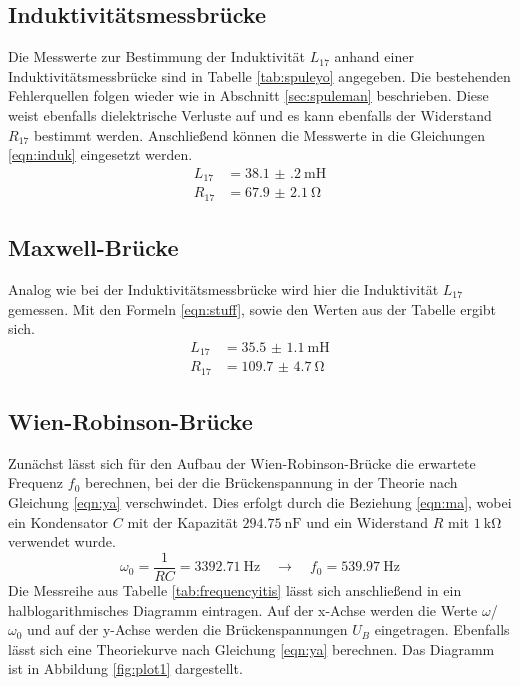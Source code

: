 \subsection{Induktivitätsmessbrücke}
Die Messwerte zur Bestimmung der Induktivität $L_{17}$ anhand einer Induktivitätsmessbrücke sind in Tabelle \ref{tab:spuleyo} angegeben. Die bestehenden Fehlerquellen
folgen wieder wie in Abschnitt \ref{sec:spuleman} beschrieben. Diese weist ebenfalls dielektrische Verluste 
auf und es kann ebenfalls der Widerstand $R_{17}$ bestimmt werden. Anschließend können die Messwerte in die Gleichungen \eqref{eqn:induk} eingesetzt werden.
\begin{align*}
L_{17} &= \SI{38.1(2)}{\milli\henry} \\
R_{17} &= \SI{67.9(21)}{\ohm} 
\end{align*}

\subsection{Maxwell-Brücke}
Analog wie bei der Induktivitätsmessbrücke wird hier die Induktivität $L_{17}$ gemessen. Mit den Formeln \eqref{eqn:stuff}, sowie den Werten aus der Tabelle ergibt sich.
\begin{align*}
    L_{17} &= \SI{35.5(11)}{\milli\henry} \\
    R_{17} &= \SI{109.7(47)}{\ohm} 
\end{align*}

\subsection{Wien-Robinson-Brücke}
Zunächst lässt sich für den Aufbau der Wien-Robinson-Brücke die erwartete Frequenz $f_{0}$ berechnen, bei der die Brückenspannung in der Theorie nach Gleichung \eqref{eqn:ya}
verschwindet. Dies erfolgt durch die Beziehung \eqref{eqn:ma}, wobei ein Kondensator $C$ mit der Kapazität $\SI{294.75}{\nano\farad}$ und ein Widerstand $R$ mit $\SI{1}{\kilo\ohm}$ verwendet wurde.
\begin{equation*}
\omega_{0} = \frac{1}{RC} = \SI{3392.71}{\hertz}  \quad \to \quad f_{0} = \SI{539.97}{\hertz}
\end{equation*}
Die Messreihe aus Tabelle \ref{tab:frequencyitis} lässt sich anschließend in ein halblogarithmisches Diagramm eintragen. Auf der x-Achse werden die Werte $\omega$/$\omega_{0}$ und auf der y-Achse werden die Brückenspannungen $U_{B}$ eingetragen. 
Ebenfalls lässt sich eine Theoriekurve nach Gleichung \eqref{eqn:ya} berechnen. Das Diagramm ist in Abbildung \ref{fig:plot1} dargestellt.


